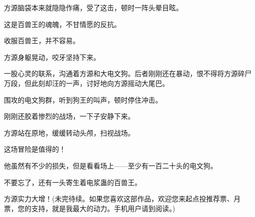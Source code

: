 \begin{this_body}
方源脑袋本来就隐隐作痛，受了这击，顿时一阵头晕目眩。

这是百兽王的魂魄，不甘情愿的反抗。

收服百兽王，并不容易。

方源身躯晃动，咬牙坚持下来。

一股心灵的联系，沟通着方源和大电文狗。后者刚刚还在暴动，恨不得将方源碎尸万段，但此刻却汪的一声，讨好地向方源摇动大尾巴。

围攻的电文狗群，听到狗王的叫声，顿时停住冲击。

刚刚还胶着惨烈的战场，一下子安静下来。

方源站在原地，缓缓转动头颅，扫视战场。

这场冒险是值得的！

他虽然有不少的损失，但是看看场上——至少有一百二十头的电文狗。

不要忘了，还有一头寄生着电浆蛊的百兽王。

方源实力大增！(未完待续。如果您喜欢这部作品，欢迎您来起点投推荐票、月票，您的支持，就是我最大的动力。手机用户请到阅读。)

\end{this_body}

